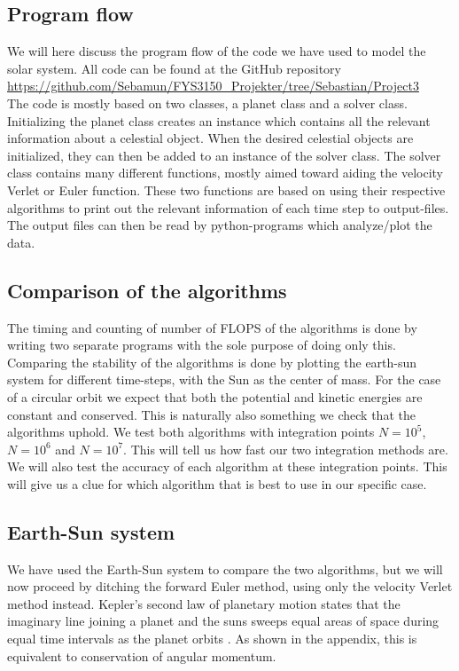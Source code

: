 \documentclass{article}
\begin{document}
\begin{multicols}{2}
\subsection{Program flow}

We will here discuss the program flow of the code we have used to model the solar system. All code can be found at the GitHub repository \\
\url{https://github.com/Sebamun/FYS3150_Projekter/tree/Sebastian/Project3}  \\ The code is mostly based on two classes, a planet class and a solver class. Initializing the planet class creates an instance which contains all the relevant information about a celestial object. When the desired celestial objects are initialized, they can then be added to an instance of the solver class. The solver class contains many different functions, mostly aimed toward aiding the velocity Verlet or Euler function. These two functions are based on using their respective algorithms to print out the relevant information of each time step to output-files. The output files can then be read by python-programs which analyze/plot the data.

\subsection{Comparison of the algorithms}
The timing and counting of number of FLOPS of the algorithms is done by writing two separate programs with the sole purpose of doing only this. Comparing the stability of the algorithms is done by plotting the earth-sun system for different time-steps, with the Sun as the center of mass. For the case of a circular orbit we expect that both the potential and kinetic energies are constant and conserved. This is naturally also something we check that the algorithms uphold. We test both algorithms with integration points $N=10^5$, $N=10^6$ and $N=10^7$. This will tell us how fast our two integration methods are. We will also test the accuracy of each algorithm at these integration points. This will give us a clue for which algorithm that is best to use in our specific case. 

\subsection{Earth-Sun system}

We have used the Earth-Sun system to compare the two algorithms, but we will now proceed by ditching the forward Euler method, using only the velocity Verlet method instead. Kepler's second law of planetary motion states that the imaginary line joining a planet and the suns sweeps equal areas of space during equal time intervals as the planet orbits \cite{94}. As shown in the appendix, this is equivalent to conservation of angular momentum.  


\end{multicols}
\end{document}
